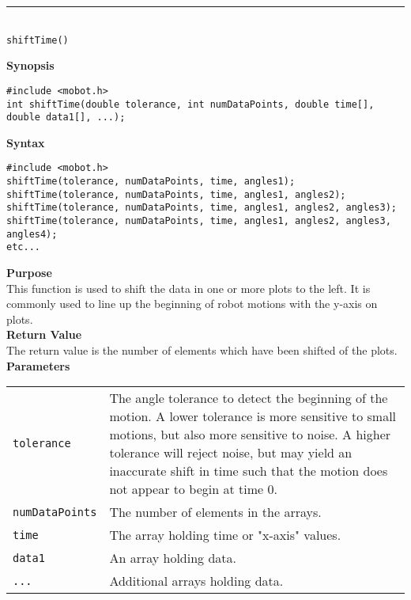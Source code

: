 \noindent
\vspace{5pt}
\rule{4.5in}{0.015in}\\
\noindent
{\LARGE \texttt{shiftTime()}}\\
{}

\noindent
{\bf Synopsis}
\vspace{-8pt}
\begin{verbatim}
#include <mobot.h>
int shiftTime(double tolerance, int numDataPoints, double time[], double data1[], ...);
\end{verbatim}

\noindent
{\bf Syntax}
\vspace{-8pt}
\begin{verbatim}
#include <mobot.h>
shiftTime(tolerance, numDataPoints, time, angles1);
shiftTime(tolerance, numDataPoints, time, angles1, angles2);
shiftTime(tolerance, numDataPoints, time, angles1, angles2, angles3);
shiftTime(tolerance, numDataPoints, time, angles1, angles2, angles3, angles4);
etc...
\end{verbatim}

\noindent
{\bf Purpose}\\
This function is used to shift the data in one or more plots to the left. It is commonly used to
line up the beginning of robot motions with the y-axis on plots.\\

\noindent
{\bf Return Value}\\
The return value is the number of elements which have been shifted of the plots. \\

\noindent
{\bf Parameters}
\vspace{-0.1in}
\begin{description}
\item               
\begin{tabular}{p{25 mm}p{145 mm}}
\texttt{tolerance} & The angle tolerance to detect the beginning of the motion. A lower tolerance
is more sensitive to small motions, but also more sensitive to noise. A higher tolerance will
reject noise, but may yield an inaccurate shift in time such that the motion does not appear to
begin at time 0. \\
\texttt{numDataPoints} & The number of elements in the arrays. \\
\texttt{time} & The array holding time or "x-axis" values. \\
\texttt{data1} & An array holding data. \\
\texttt{...} & Additional arrays holding data. 
\end{tabular}
\end{description}

